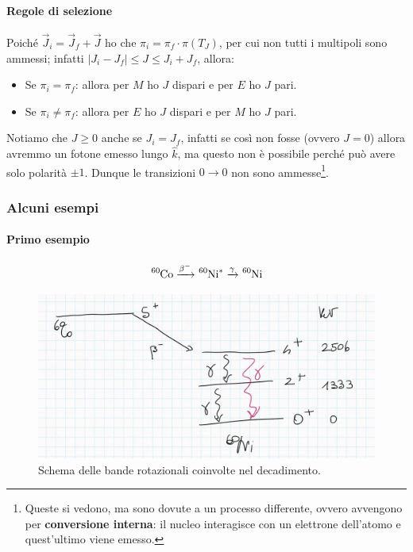 \paragraph{Regole di selezione} Poiché $\vec{J}_i = \vec{J}_f + \vec{J}$ ho che $\pi_i = \pi_f \cdot \pi(T_J)$, per cui non tutti i multipoli sono ammessi; infatti $|J_i - J_f|\leq J\leq J_i+J_f$, allora:
\begin{itemize}
    \item Se $\pi_i = \pi_f$: allora per $M$ ho $J$ dispari e per $E$ ho $J$ pari.
    \item Se $\pi_i \not = \pi_f$: allora per $E$ ho $J$ dispari e per $M$ ho $J$ pari.
\end{itemize}
Notiamo che $J\geq 0$ anche se $J_i=J_f$, infatti se così non fosse (ovvero $J=0$) allora avremmo un fotone emesso lungo $\hat{k}$, ma questo non è possibile perché può avere solo polarità $\pm 1$. Dunque le transizioni $0\to 0$ non sono ammesse\footnote{Queste si vedono, ma sono dovute a un processo differente, ovvero avvengono per \textbf{conversione interna}: il nucleo interagisce con un elettrone dell'atomo e quest'ultimo viene emesso.}.

\subsubsection{Alcuni esempi}
\paragraph{Primo esempio}
$$\ce{^{60}Co}  \xrightarrow{\beta^-} \ce{^{60}Ni}^*  \xrightarrow{\gamma}  \ce{^{60}Ni}$$

\begin{figure}[h]
    \centering
    \includegraphics[scale=0.2]{Immagini/0310_bande.png}
    \caption{Schema delle bande rotazionali coinvolte nel decadimento.}
    \label{0310_bande}
\end{figure}

